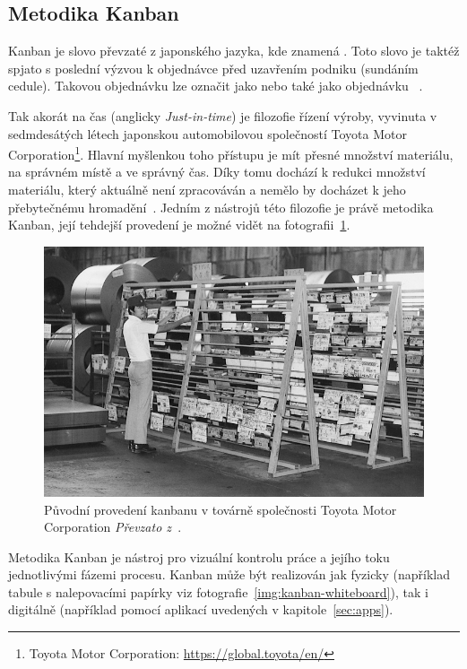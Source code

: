 \subsection{Metodika Kanban}
Kanban je slovo převzaté z japonského jazyka, kde znamená . Toto slovo je taktéž spjato s poslední výzvou k objednávce před uzavřením podniku (sundáním cedule). Takovou objednávku lze označit jako  nebo také jako objednávku ~\cite{bib:dict-kanban}. 

Tak akorát na čas (anglicky \emph{Just-in-time}) je filozofie řízení výroby, vyvinuta v sedmdesátých létech japonskou automobilovou společností Toyota Motor Corporation\footnote{Toyota Motor Corporation: \url{https://global.toyota/en/}}. Hlavní myšlenkou toho přístupu je mít přesné množství materiálu, na správném místě a ve správný čas. Díky tomu dochází k redukci množství materiálu, který aktuálně není zpracováván a nemělo by docházet k jeho přebytečnému hromadění~\cite{bib:just-in-time}. Jedním z nástrojů této filozofie je právě metodika Kanban, její tehdejší provedení je možné vidět na fotografii~\ref{img:kanban-toyota}.

\begin{figure}[H]
	\centering
	\includegraphics[width=\textwidth]{obrazky-figures/toyota-kanban.jpg}
	\caption{Původní provedení kanbanu v továrně společnosti Toyota Motor Corporation \emph{Převzato z~\cite{bib:toyota-history}}.}
	\label{img:kanban-toyota}
\end{figure}

Metodika Kanban je nástroj pro vizuální kontrolu práce a jejího toku jednotlivými fázemi procesu. Kanban může být realizován jak fyzicky (například tabule s nalepovacími papírky viz fotografie~\ref{img:kanban-whiteboard}), tak i digitálně (například pomocí aplikací uvedených v kapitole~\ref{sec:apps}). 

